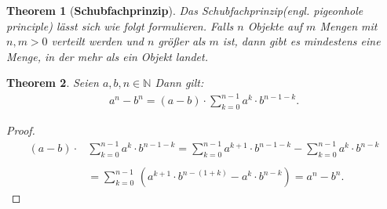 \documentclass[12pt,oneside]{article}
\newtheorem{theorem}{Theorem}[section]
\theoremstyle{remark}
\theoremstyle{definition}
\begin{document}
\begin{theorem}[\textbf{Schubfachprinzip}]\label{pigeonhole} Das Schubfachprinzip(engl. pigeonhole principle) lässt sich wie folgt formulieren.
Falls $n$ Objekte auf $m$ Mengen mit $n,m > 0$ verteilt werden und $n$ größer als $m$ ist, dann gibt es mindestens eine Menge, in der mehr als ein Objekt landet. 

\end{theorem}

\smallskip

\begin{theorem}\label{funny_id}
Seien $a,b,n \in \mathbb{N}$ Dann gilt:\newline\newline \begin{align*}
    a^{n} - b^n = (a - b) \cdot \sum_{k = 0}^{n - 1} a^{k} \cdot  b^{n - 1 - k}.
\end{align*}
\end{theorem}

\begin{proof}
\begin{align*}
(a - b) \cdot &\sum_{k = 0}^{n - 1} a^{k} \cdot  b^{n - 1 - k} = \sum_{k = 0}^{n - 1} a^{k + 1}\cdot b^{n - 1 - k} - \sum_{k = 0}^{n - 1} a^k \cdot b^{n - k} \\
\\
&= \sum_{k = 0}^{n - 1} \, (a^{k + 1}\cdot b^{n - (1 + k)} -a^k \cdot b^{n - k}) = a^n - b^n.
\end{align*}
\end{proof}

\smallskip
\end{document}
